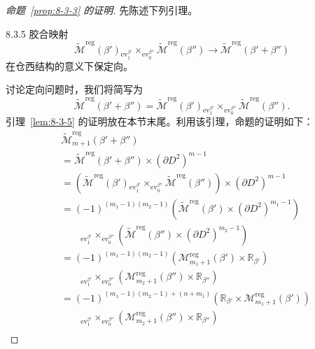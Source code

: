 \begin{proof}[命题~\ref{prop:8-3-3} 的证明]
先陈述下列引理。

\begin{lemma}{8.3.5}\label{lem:8-3-5}
胶合映射
\[
 \widetilde{\mathcal M}^{\mathrm{reg}}(\beta')
 {}_{\operatorname{ev}_1^{\beta'}}\!\times_{\operatorname{ev}_0^{\beta''}}
 \widetilde{\mathcal M}^{\mathrm{reg}}(\beta'')
 \longrightarrow
 \widetilde{\mathcal M}^{\mathrm{reg}}(\beta'+\beta'')
\]
在仓西结构的意义下保定向。
\end{lemma}

讨论定向问题时，我们将简写为
\[
 \widetilde{\mathcal M}^{\mathrm{reg}}(\beta'+\beta'')
 =\widetilde{\mathcal M}^{\mathrm{reg}}(\beta')
 {}_{\operatorname{ev}_1^{\beta'}}\!\times_{\operatorname{ev}_0^{\beta''}}
 \widetilde{\mathcal M}^{\mathrm{reg}}(\beta'').
\]
引理~\ref{lem:8-3-5} 的证明放在本节末尾。利用该引理，命题的证明如下：
\[
\begin{aligned}
 &\widetilde{\mathcal M}_{m+1}^{\mathrm{reg}}(\beta'+\beta'')\\
 &={}
 \widetilde{\mathcal M}^{\mathrm{reg}}(\beta'+\beta'')
 \times(\partial D^2)^{m-1}\\
 &={}
 \left(
 \widetilde{\mathcal M}^{\mathrm{reg}}(\beta')
 {}_{\operatorname{ev}_1^{\beta'}}\!\times_{\operatorname{ev}_0^{\beta''}}
 \widetilde{\mathcal M}^{\mathrm{reg}}(\beta'')
 \right)\times(\partial D^2)^{m-1}\\
 &=(-1)^{(m_1-1)(m_2-1)}
 \left(\widetilde{\mathcal M}^{\mathrm{reg}}(\beta')
       \times(\partial D^2)^{m_1-1}\right)\\[-2pt]
 &\qquad{}
 {}_{\operatorname{ev}_1^{\beta'}}\!\times_{\operatorname{ev}_0^{\beta''}}
 \left(\widetilde{\mathcal M}^{\mathrm{reg}}(\beta'')
       \times(\partial D^2)^{m_2-1}\right)\\
 &=(-1)^{(m_1-1)(m_2-1)}
 \left(\mathcal M_{m_1+1}^{\mathrm{reg}}(\beta')
       \times\mathbb R_{\beta'}\right)\\[-2pt]
 &\qquad{}
 {}_{\operatorname{ev}_1^{\beta'}}\!\times_{\operatorname{ev}_0^{\beta''}}
 \left(\mathcal M_{m_2+1}^{\mathrm{reg}}(\beta'')
       \times\mathbb R_{\beta''}\right)\\
 &=(-1)^{(m_1-1)(m_2-1)+(n+m_1)}
 \left(\mathbb R_{\beta'}\times
       \mathcal M_{m_1+1}^{\mathrm{reg}}(\beta')\right)\\[-2pt]
 &\qquad{}
 {}_{\operatorname{ev}_1^{\beta'}}\!\times_{\operatorname{ev}_0^{\beta''}}
 \left(\mathcal M_{m_2+1}^{\mathrm{reg}}(\beta'')
       \times\mathbb R_{\beta''}\right)\\

\end{aligned}\]
\end{proof}
